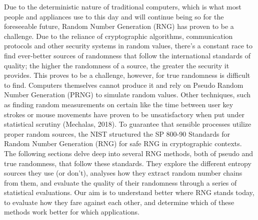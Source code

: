 Due to the deterministic nature of traditional computers, which is what most people and appliances use to this day and will continue being so for the foreseeable future, Random Number Generation (RNG) has proven to be a challenge. Due to the reliance of cryptographic algorithms, communication protocols and other security systems in random values, there’s a constant race to find ever-better sources of randomness that follow the international standards of quality; the higher the randomness of a source, the greater the security it provides. This proves to be a challenge, however, for true randomness is difficult to find. Computers themselves cannot produce it and rely on Pseudo Random Number Generation (PRNG) to simulate random values. Other techniques, such as finding random measurements on certain like the time between user key strokes or mouse movements have proven to be unsatisfactory when put under statistical scrutiny (Mechalas, 2018). 
To guarantee that sensible processes utilize proper random sources, the NIST structured the SP 800-90 Standards for Random Number Generation (RNG) for safe RNG in cryptographic contexts. The following sections delve deep into several RNG methods, both of pseudo and true randomness, that follow these standards. They explore the different entropy sources they use (or don’t), analyses how they extract random number chains from them, and evaluate the quality of their randomness through a series of statistical evaluations. Our aim is to understand better where RNG stands today, to evaluate how they fare against each other, and determine which of these methods work better for which applications.
